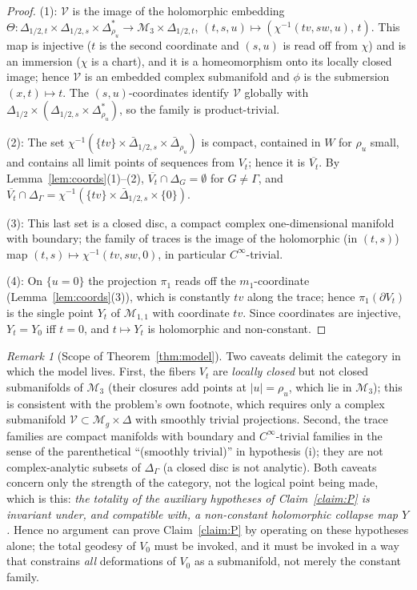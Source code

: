 \documentclass[11pt]{amsart}
\newcommand{\M}{\mathcal{M}}
\theoremstyle{plain}
\theoremstyle{definition}
\theoremstyle{remark}
\newtheorem{remark}[theorem]{Remark}
\begin{document}
\begin{proof}
(1): $\mathcal V$ is the image of the holomorphic embedding
$\Theta:\Delta_{1/2,t}\times\Delta_{1/2,s}\times\Delta^{*}_{\rho_u}\to
\M_3\times\Delta_{1/2,t}$, $(t,s,u)\mapsto(\chi^{-1}(tv,sw,u),\,t)$. This map is
injective ($t$ is the second coordinate and $(s,u)$ is read off from $\chi$) and is
an immersion ($\chi$ is a chart), and it is a homeomorphism onto its locally closed
image; hence $\mathcal V$ is an embedded complex submanifold and $\phi$ is the
submersion $(x,t)\mapsto t$. The $(s,u)$-coordinates identify $\mathcal V$
globally with $\Delta_{1/2}\times(\Delta_{1/2,s}\times\Delta^*_{\rho_u})$, so the
family is product-trivial.

(2): The set $\chi^{-1}(\{tv\}\times\bar\Delta_{1/2,s}\times\bar\Delta_{\rho_u})$ is
compact, contained in $W$ for $\rho_u$ small, and contains all limit points of
sequences from $V_t$; hence it is $\overline{V_t}$. By Lemma~\ref{lem:coords}(1)--(2),
$\overline{V_t}\cap\Delta_G=\emptyset$ for $G\neq\Gamma$, and
$\overline{V_t}\cap\Delta_\Gamma=\chi^{-1}(\{tv\}\times\bar\Delta_{1/2,s}\times\{0\})$.

(3): This last set is a closed disc, a compact complex one-dimensional manifold with
boundary; the family of traces is the image of the holomorphic (in $(t,s)$) map
$(t,s)\mapsto \chi^{-1}(tv,sw,0)$, in particular $C^\infty$-trivial.

(4): On $\{u=0\}$ the projection $\pi_1$ reads off the $m_1$-coordinate
(Lemma~\ref{lem:coords}(3)), which is constantly $tv$ along the trace; hence
$\pi_1(\partial V_t)$ is the single point $Y_t$ of $\M_{1,1}$ with coordinate $tv$.
Since coordinates are injective, $Y_t=Y_0$ iff $t=0$, and $t\mapsto Y_t$ is
holomorphic and non-constant.
\end{proof}

\begin{remark}[Scope of Theorem~\ref{thm:model}]\label{rem:scope}
Two caveats delimit the category in which the model lives. First, the fibers $V_t$
are \emph{locally closed} but not closed submanifolds of $\M_3$ (their closures add
points at $|u|=\rho_u$, which lie in $\M_3$); this is consistent with the problem's
own footnote, which requires only a complex submanifold
$\mathcal V\subset \M_g\times\Delta$ with smoothly trivial projections. Second, the
trace families are compact manifolds with boundary and $C^\infty$-trivial families in
the sense of the parenthetical ``(smoothly trivial)'' in hypothesis (i); they are
not complex-analytic subsets of $\Delta_\Gamma$ (a closed disc is not analytic).
Both caveats concern only the strength of the category, not the logical point being
made, which is this: \emph{the totality of the auxiliary hypotheses of
Claim~\ref{claim:P} is invariant under, and compatible with, a non-constant
holomorphic collapse map $Y$.} Hence no argument can prove Claim~\ref{claim:P} by
operating on these hypotheses alone; the total geodesy of $V_0$ must be invoked, and
it must be invoked in a way that constrains \emph{all} deformations of $V_0$ as a
submanifold, not merely the constant family.
\end{remark}
\end{document}
